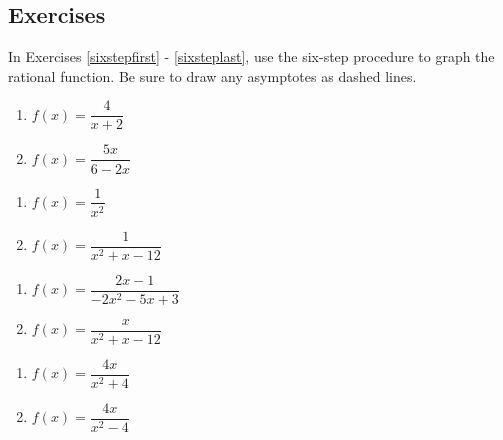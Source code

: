 \newpage

\subsection{Exercises}

In Exercises \ref{sixstepfirst} - \ref{sixsteplast}, use the six-step procedure to graph the rational function.  Be sure to draw any asymptotes as dashed lines.

\begin{multicols}{2}
\begin{enumerate}

\item $f(x) = \dfrac{4}{x + 2}$ \label{sixstepfirst}
\item $f(x) = \dfrac{5x}{6 - 2x}$

\setcounter{HW}{\value{enumi}}
\end{enumerate}
\end{multicols}

\begin{multicols}{2}
\begin{enumerate}
\setcounter{enumi}{\value{HW}}

\item $f(x) = \dfrac{1}{x^{2}}$
\item $f(x) = \dfrac{1}{x^{2} + x - 12}$

\setcounter{HW}{\value{enumi}}
\end{enumerate}
\end{multicols}

\begin{multicols}{2}
\begin{enumerate}
\setcounter{enumi}{\value{HW}}

\item $f(x) = \dfrac{2x - 1}{-2x^{2} - 5x + 3}$
\item $f(x) = \dfrac{x}{x^{2} + x - 12}$ 

\setcounter{HW}{\value{enumi}}
\end{enumerate}
\end{multicols}

\begin{multicols}{2}
\begin{enumerate}
\setcounter{enumi}{\value{HW}}

\item $f(x) = \dfrac{4x}{x^2+4}$
\item $f(x) = \dfrac{4x}{x^2-4}$

\setcounter{HW}{\value{enumi}}
\end{enumerate}
\end{multicols}

